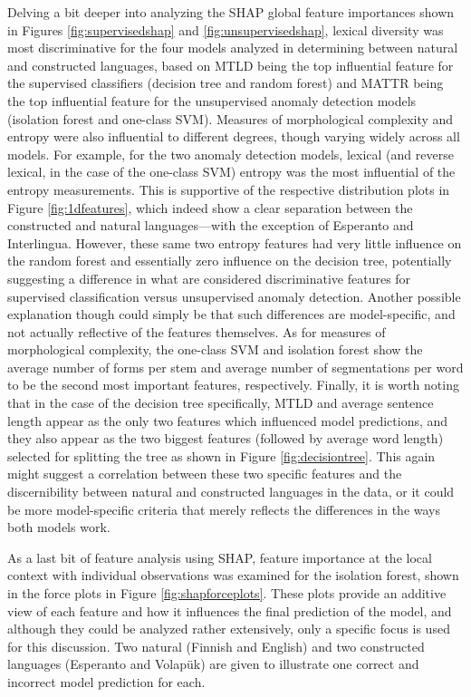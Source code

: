 \documentclass[12pt,a4paper]{article}
\numberwithin{figure}{section}
\numberwithin{table}{section}
\numberwithin{definition}{section}
\begin{document}
Delving a bit deeper into analyzing the SHAP global feature importances shown in Figures \ref{fig:supervisedshap} and \ref{fig:unsupervisedshap}, lexical diversity was most discriminative for the four models analyzed in determining between natural and constructed languages, based on MTLD being the top influential feature for the supervised classifiers (decision tree and random forest) and MATTR being the top influential feature for the unsupervised anomaly detection models (isolation forest and one-class SVM). Measures of morphological complexity and entropy were also influential to different degrees, though varying widely across all models. For example, for the two anomaly detection models, lexical (and reverse lexical, in the case of the one-class SVM) entropy was the most influential of the entropy measurements. This is supportive of the respective distribution plots in Figure \ref{fig:1dfeatures}, which indeed show a clear separation between the constructed and natural languages---with the exception of Esperanto and Interlingua. However, these same two entropy features had very little influence on the random forest and essentially zero influence on the decision tree, potentially suggesting a difference in what are considered discriminative features for supervised classification versus unsupervised anomaly detection. Another possible explanation though could simply be that such differences are model-specific, and not actually reflective of the features themselves. As for measures of morphological complexity, the one-class SVM and isolation forest show the average number of forms per stem and average number of segmentations per word to be the second most important features, respectively. Finally, it is worth noting that in the case of the decision tree specifically, MTLD and average sentence length appear as the only two features which influenced model predictions, and they also appear as the two biggest features (followed by average word length) selected for splitting the tree as shown in Figure \ref{fig:decisiontree}. This again might suggest a correlation between these two specific features and the discernibility between natural and constructed languages in the data, or it could be more model-specific criteria that merely reflects the differences in the ways both models work.

As a last bit of feature analysis using SHAP, feature importance at the local context with individual observations was examined for the isolation forest, shown in the force plots in Figure \ref{fig:shapforceplots}. These plots provide an additive view of each feature and how it influences the final prediction of the model, and although they could be analyzed rather extensively, only a specific focus is used for this discussion. Two natural (Finnish and English) and two constructed languages (Esperanto and Volapük) are given to illustrate one correct and incorrect model prediction for each.
\end{document}
